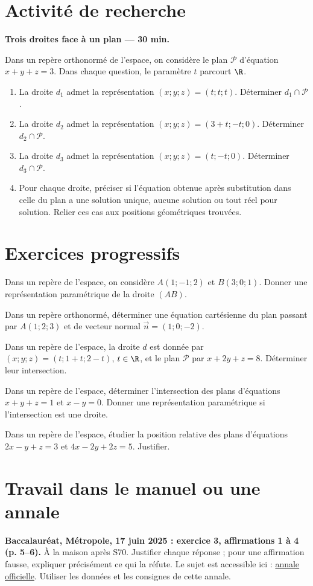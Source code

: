 \section{Activité de recherche}\textbf{Trois droites face à un plan --- 30 min.}\par Dans un repère orthonormé de l'espace, on considère le plan $\mathcal P$ d'équation $x+y+z=3$. Dans chaque question, le paramètre $t$ parcourt $\R$.
\begin{enumerate}\item La droite $d_1$ admet la représentation $(x;y;z)=(t;t;t)$. Déterminer $d_1\cap\mathcal P$.
\item La droite $d_2$ admet la représentation $(x;y;z)=(3+t;-t;0)$. Déterminer $d_2\cap\mathcal P$.
\item La droite $d_3$ admet la représentation $(x;y;z)=(t;-t;0)$. Déterminer $d_3\cap\mathcal P$.
\item Pour chaque droite, préciser si l'équation obtenue après substitution dans celle du plan a une solution unique, aucune solution ou tout réel pour solution. Relier ces cas aux positions géométriques trouvées.\end{enumerate}

\section{Exercices progressifs}

Dans un repère de l'espace, on considère $A(1;-1;2)$ et $B(3;0;1)$. Donner une représentation paramétrique de la droite $(AB)$.

Dans un repère orthonormé, déterminer une équation cartésienne du plan passant par $A(1;2;3)$ et de vecteur normal $\vec n=(1;0;-2)$.

Dans un repère de l'espace, la droite $d$ est donnée par $(x;y;z)=(t;1+t;2-t)$, $t\in\R$, et le plan $\mathcal P$ par $x+2y+z=8$. Déterminer leur intersection.

Dans un repère de l'espace, déterminer l'intersection des plans d'équations $x+y+z=1$ et $x-y=0$. Donner une représentation paramétrique si l'intersection est une droite.

Dans un repère de l'espace, étudier la position relative des plans d'équations $2x-y+z=3$ et $4x-2y+2z=5$. Justifier.

\section{Travail dans le manuel ou une annale}\textbf{Baccalauréat, Métropole, 17 juin 2025 : exercice 3, affirmations 1 à 4 (p. 5--6).} À la maison après S70. Justifier chaque réponse ; pour une affirmation fausse, expliquer précisément ce qui la réfute. Le sujet est accessible ici : \href{https://www.education.gouv.fr/sites/default/files/2025-06/baccalaur-at-g-n-ral-2025-math-matiques-440856.pdf}{annale officielle}. Utiliser les données et les consignes de cette annale.

